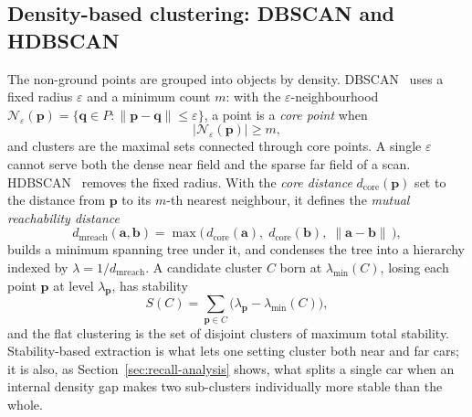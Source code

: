 \subsection{Density-based clustering: DBSCAN and HDBSCAN}
\label{sec:th-clustering}
The non-ground points are grouped into objects by density. DBSCAN~\cite{ester1996dbscan}
uses a fixed radius $\varepsilon$ and a minimum count $m$: with the
$\varepsilon$-neighbourhood
$\mathcal{N}_\varepsilon(\mathbf{p}) = \{\mathbf{q}\in P : \lVert\mathbf{p}-\mathbf{q}\rVert \le \varepsilon\}$,
a point is a \emph{core point} when
\begin{equation}
  \lvert \mathcal{N}_\varepsilon(\mathbf{p}) \rvert \ge m ,
\end{equation}
and clusters are the maximal sets connected through core points. A single $\varepsilon$
cannot serve both the dense near field and the sparse far field of a scan.
HDBSCAN~\cite{campello2013hdbscan,mcinnes2017hdbscan} removes the fixed radius. With the
\emph{core distance} $d_{\mathrm{core}}(\mathbf{p})$ set to the distance from $\mathbf{p}$ to
its $m$-th nearest neighbour, it defines the \emph{mutual reachability distance}
\begin{equation}
  d_{\mathrm{mreach}}(\mathbf{a},\mathbf{b}) = \max\!\bigl(\, d_{\mathrm{core}}(\mathbf{a}),\; d_{\mathrm{core}}(\mathbf{b}),\; \lVert\mathbf{a}-\mathbf{b}\rVert \,\bigr),
\end{equation}
builds a minimum spanning tree under it, and condenses the tree into a hierarchy indexed by
$\lambda = 1/d_{\mathrm{mreach}}$. A candidate cluster $C$ born at $\lambda_{\min}(C)$, losing
each point $\mathbf{p}$ at level $\lambda_{\mathbf{p}}$, has stability
\begin{equation}
  S(C) = \sum_{\mathbf{p}\in C} \bigl(\lambda_{\mathbf{p}} - \lambda_{\min}(C)\bigr),
\end{equation}
and the flat clustering is the set of disjoint clusters of maximum total stability.
Stability-based extraction is what lets one setting cluster both near and far cars; it is
also, as Section~\ref{sec:recall-analysis} shows, what splits a single car when an internal
density gap makes two sub-clusters individually more stable than the whole.

